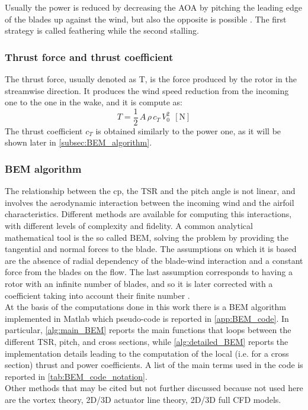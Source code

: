 Usually the power is reduced by decreasing the \acrshort{AOA} by pitching the leading edge of the blades up against the wind, but also the opposite is possible \cite{Aerodynamics_of_wind_turbines}. The first strategy is called feathering while the second stalling.

\subsubsection{Thrust force and thrust coefficient}
The thrust force, usually denoted as T, is the force produced by the rotor in the streamwise direction. It produces the wind speed reduction from the incoming one to the one in the wake, and it is compute as:
\begin{equation}
    T = \frac{1}{2} \, A \, \rho \, c_T \, V_0^2 \ \ \left[\si{\newton}\right]
    \label{eq:thrust_coeff}
\end{equation}
The thrust coefficient $c_T$ is obtained similarly to the power one, as it will be shown later in \autoref{subsec:BEM_algorithm}.

\subsubsection{BEM algorithm}\label{subsec:BEM_algorithm}
The relationship between the \acrshort{cp}, the \acrshort{TSR} and the pitch angle is not linear, and involves the aerodynamic interaction between the incoming wind and the airfoil characteristics. Different methods are available for computing this interactions, with different levels of complexity and fidelity. A common analytical mathematical tool is the so called \acrfull{BEM}, solving the problem by providing the tangential and normal forces to the blade. The assumptions on which it is based are the absence of radial dependency of the blade-wind interaction and a constant force from the blades on the flow. The last assumption corresponds to having a rotor with an infinite number of blades, and so it is later corrected with a coefficient taking into account their finite number \cite{Aerodynamics_of_wind_turbines}.\\
At the basis of the computations done in this work there is a \acrshort{BEM} algorithm implemented in Matlab which pseudo-code is reported in \autoref{app:BEM_code}. In particular, \autoref{alg:main_BEM} reports the main functions that loops between the different TSR, pitch, and cross sections, while \autoref{alg:detailed_BEM} reports the implementation details leading to the computation of the local (i.e. for a cross section) thrust and power coefficients. A list of the main terms used in the code is reported in \autoref{tab:BEM_code_notation}. \\
Other methods that may be cited but not further discussed because not used here are the vortex theory, 2D/3D actuator line theory, 2D/3D full CFD models.

